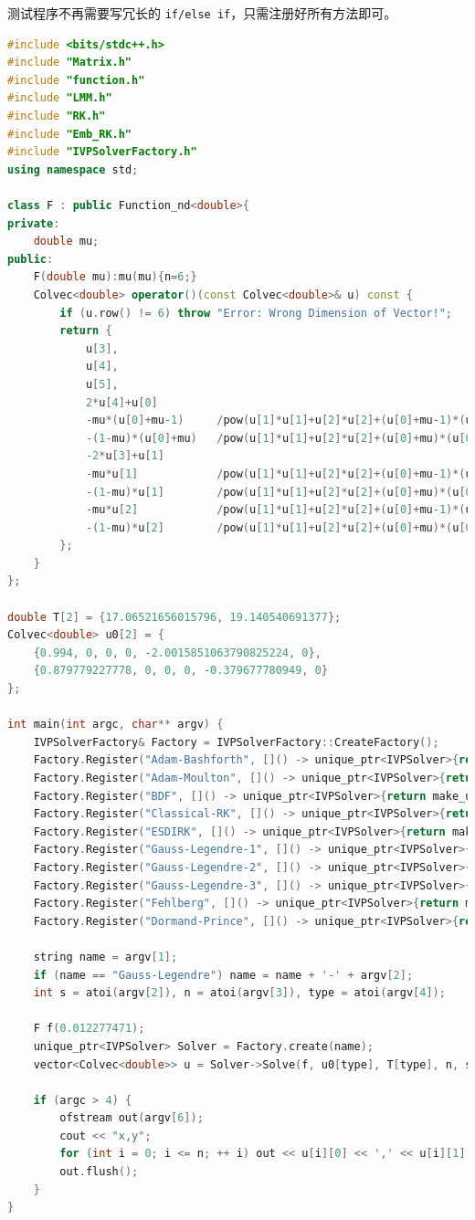\documentclass{ctexart}
\begin{document}
测试程序不再需要写冗长的 \verb|if/else if|，只需注册好所有方法即可。

\begin{lstlisting}[language=c++]
#include <bits/stdc++.h>
#include "Matrix.h"
#include "function.h"
#include "LMM.h"
#include "RK.h"
#include "Emb_RK.h"
#include "IVPSolverFactory.h"
using namespace std;

class F : public Function_nd<double>{
private:
	double mu;
public:
	F(double mu):mu(mu){n=6;}
	Colvec<double> operator()(const Colvec<double>& u) const {
		if (u.row() != 6) throw "Error: Wrong Dimension of Vector!";
		return {
			u[3],
			u[4],
			u[5],
			2*u[4]+u[0]
			-mu*(u[0]+mu-1)		/pow(u[1]*u[1]+u[2]*u[2]+(u[0]+mu-1)*(u[0]+mu-1),1.5)
			-(1-mu)*(u[0]+mu)	/pow(u[1]*u[1]+u[2]*u[2]+(u[0]+mu)*(u[0]+mu)	,1.5),
			-2*u[3]+u[1]
			-mu*u[1]			/pow(u[1]*u[1]+u[2]*u[2]+(u[0]+mu-1)*(u[0]+mu-1),1.5)
			-(1-mu)*u[1]		/pow(u[1]*u[1]+u[2]*u[2]+(u[0]+mu)*(u[0]+mu)	,1.5),
			-mu*u[2]			/pow(u[1]*u[1]+u[2]*u[2]+(u[0]+mu-1)*(u[0]+mu-1),1.5)
			-(1-mu)*u[2]		/pow(u[1]*u[1]+u[2]*u[2]+(u[0]+mu)*(u[0]+mu)	,1.5)
		};
	}
};

double T[2] = {17.06521656015796, 19.140540691377};
Colvec<double> u0[2] = {
	{0.994, 0, 0, 0, -2.0015851063790825224, 0},
	{0.879779227778, 0, 0, 0, -0.379677780949, 0}
};

int main(int argc, char** argv) {
	IVPSolverFactory& Factory = IVPSolverFactory::CreateFactory();
	Factory.Register("Adam-Bashforth", []() -> unique_ptr<IVPSolver>{return make_unique<Adam_Bashforth>();});
	Factory.Register("Adam-Moulton", []() -> unique_ptr<IVPSolver>{return make_unique<Adam_Moulton>();});
	Factory.Register("BDF", []() -> unique_ptr<IVPSolver>{return make_unique<BDF>();});
	Factory.Register("Classical-RK", []() -> unique_ptr<IVPSolver>{return make_unique<Classical_4th_RK>();});
	Factory.Register("ESDIRK", []() -> unique_ptr<IVPSolver>{return make_unique<ESDIRK>();});
	Factory.Register("Gauss-Legendre-1", []() -> unique_ptr<IVPSolver>{return make_unique<Gauss>(1);});
	Factory.Register("Gauss-Legendre-2", []() -> unique_ptr<IVPSolver>{return make_unique<Gauss>(2);});
	Factory.Register("Gauss-Legendre-3", []() -> unique_ptr<IVPSolver>{return make_unique<Gauss>(3);});
	Factory.Register("Fehlberg", []() -> unique_ptr<IVPSolver>{return make_unique<Fehlberg_Emb_RK>();});
	Factory.Register("Dormand-Prince", []() -> unique_ptr<IVPSolver>{return make_unique<Dormand_Prince_Emb_RK>();});

	string name = argv[1];
	if (name == "Gauss-Legendre") name = name + '-' + argv[2];
	int s = atoi(argv[2]), n = atoi(argv[3]), type = atoi(argv[4]);

	F f(0.012277471);
	unique_ptr<IVPSolver> Solver = Factory.create(name);
	vector<Colvec<double>> u = Solver->Solve(f, u0[type], T[type], n, s);

	if (argc > 4) {
		ofstream out(argv[6]);
		cout << "x,y";
		for (int i = 0; i <= n; ++ i) out << u[i][0] << ',' << u[i][1] << '\n';
		out.flush();
	}
}
\end{lstlisting}
\end{document}
